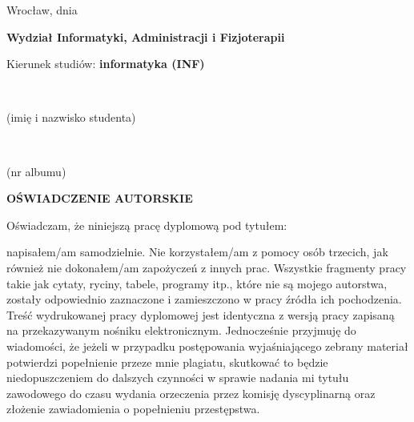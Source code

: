
\makeatletter
{}

\begin{flushright}
    Wrocław, dnia \@when
  \end{flushright}

  \begin{flushleft}
    {\fontsize{14}{14} \selectfont
    
    \vspace*{20pt}
    {\bf Wydział Informatyki, Administracji i Fizjoterapii}
    
    \bigskip
    Kierunek studiów: {\bf informatyka (INF)}
    }  
  \vspace*{30pt}
  
  {~\@author} %
  \vspace*{-4pt}
  
  \makebox[220pt][r]{\dotfill} %

  \vspace*{-2pt}
  {\scriptsize (imię i nazwisko studenta)}

  \bigskip
  {~\@album} %
  
  \vspace*{-4pt}
  \makebox[220pt][r]{\dotfill} %
  
  \vspace*{-2pt}
  {\scriptsize (nr albumu)}
\end{flushleft}

  \bigskip

\begin{center}
  {\fontsize{16}{16} \selectfont \bf OŚWIADCZENIE AUTORSKIE}
\end{center}

\bigskip


    Oświadczam, że niniejszą pracę dyplomową pod tytułem:
    \begin{center}
        {\fontsize{16}{16} \selectfont \bf \@title}
    \end{center}
    napisałem/am samodzielnie. Nie korzystałem/am z pomocy osób trzecich, jak również nie dokonałem/am zapożyczeń z innych prac.
    \newline
    \newline
    \indent Wszystkie fragmenty pracy takie jak cytaty, ryciny, tabele, programy itp., które nie są mojego autorstwa, zostały odpowiednio zaznaczone i zamieszczono w pracy źródła ich pochodzenia. Treść wydrukowanej pracy dyplomowej jest identyczna z wersją pracy zapisaną na przekazywanym nośniku elektronicznym.
    \newline
    \newline
    \indent Jednocześnie przyjmuję do wiadomości, że jeżeli w przypadku postępowania wyjaśniającego zebrany materiał potwierdzi popełnienie przeze mnie plagiatu, skutkować to będzie niedopuszczeniem do dalszych czynności w sprawie nadania mi tytułu zawodowego do czasu wydania orzeczenia przez komisję dyscyplinarną oraz złożenie zawiadomienia o popełnieniu przestępstwa.

